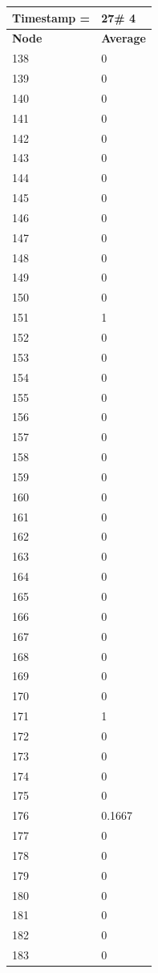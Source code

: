 \begin{tabular}{|l||l|}
\hline
\textbf{Timestamp =} & \textbf{27}\# 4\\\hline
	\textbf{Node} & \textbf{Average} \\ \hline
\hline
	138 & 0 \\ \hline
	139 & 0 \\ \hline
	140 & 0 \\ \hline
	141 & 0 \\ \hline
	142 & 0 \\ \hline
	143 & 0 \\ \hline
	144 & 0 \\ \hline
	145 & 0 \\ \hline
	146 & 0 \\ \hline
	147 & 0 \\ \hline
	148 & 0 \\ \hline
	149 & 0 \\ \hline
	150 & 0 \\ \hline
	151 & 1 \\ \hline
	152 & 0 \\ \hline
	153 & 0 \\ \hline
	154 & 0 \\ \hline
	155 & 0 \\ \hline
	156 & 0 \\ \hline
	157 & 0 \\ \hline
	158 & 0 \\ \hline
	159 & 0 \\ \hline
	160 & 0 \\ \hline
	161 & 0 \\ \hline
	162 & 0 \\ \hline
	163 & 0 \\ \hline
	164 & 0 \\ \hline
	165 & 0 \\ \hline
	166 & 0 \\ \hline
	167 & 0 \\ \hline
	168 & 0 \\ \hline
	169 & 0 \\ \hline
	170 & 0 \\ \hline
	171 & 1 \\ \hline
	172 & 0 \\ \hline
	173 & 0 \\ \hline
	174 & 0 \\ \hline
	175 & 0 \\ \hline
	176 & 0.1667 \\ \hline
	177 & 0 \\ \hline
	178 & 0 \\ \hline
	179 & 0 \\ \hline
	180 & 0 \\ \hline
	181 & 0 \\ \hline
	182 & 0 \\ \hline
	183 & 0 \\ \hline
\end{tabular}
